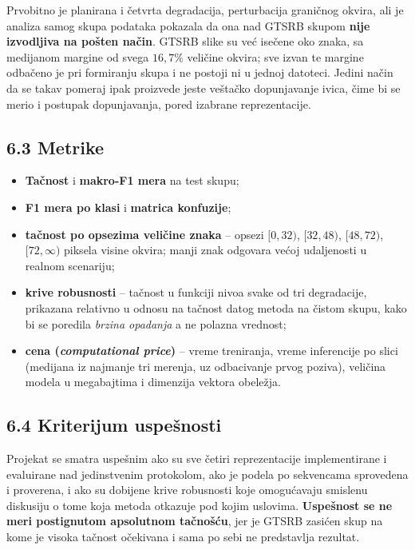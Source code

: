 \documentclass[11pt,a4paper]{article}
\begin{document}
Prvobitno je planirana i četvrta degradacija, perturbacija graničnog okvira, ali je analiza samog skupa podataka pokazala da ona nad GTSRB skupom \textbf{nije izvodljiva na pošten način}. GTSRB slike su već isečene oko znaka, sa medijanom margine od svega $16{,}7\%$ veličine okvira; sve izvan te margine odbačeno je pri formiranju skupa i ne postoji ni u jednoj datoteci. Jedini način da se takav pomeraj ipak proizvede jeste veštačko dopunjavanje ivica, čime bi se merio i postupak dopunjavanja, pored izabrane reprezentacije.

\subsection*{6.3 Metrike}

\begin{itemize}
  \item \textbf{Tačnost} i \textbf{makro-F1 mera} na test skupu;
  \item \textbf{F1 mera po klasi} i \textbf{matrica konfuzije};
  \item \textbf{tačnost po opsezima veličine znaka} -- opsezi $[0,32)$, $[32,48)$, $[48,72)$, $[72,\infty)$ piksela visine okvira; manji znak odgovara većoj udaljenosti u realnom scenariju;
  \item \textbf{krive robusnosti} -- tačnost u funkciji nivoa svake od tri degradacije, prikazana relativno u odnosu na tačnost datog metoda na čistom skupu, kako bi se poredila \emph{brzina opadanja} a ne polazna vrednost;
  \item \textbf{cena (\textit{computational price})} -- vreme treniranja, vreme inferencije po slici (medijana iz najmanje tri merenja, uz odbacivanje prvog poziva), veličina modela u megabajtima i dimenzija vektora obeležja.
\end{itemize}

\subsection*{6.4 Kriterijum uspešnosti}

Projekat se smatra uspešnim ako su sve četiri reprezentacije implementirane i evaluirane nad jedinstvenim protokolom, ako je podela po sekvencama sprovedena i proverena, i ako su dobijene krive robusnosti koje omogućavaju smislenu diskusiju o tome koja metoda otkazuje pod kojim uslovima. \textbf{Uspešnost se ne meri postignutom apsolutnom tačnošću}, jer je GTSRB zasićen skup na kome je visoka tačnost očekivana i sama po sebi ne predstavlja rezultat.
\end{document}
